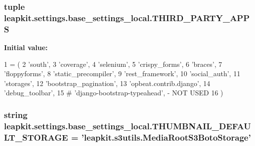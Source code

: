 \hypertarget{namespaceleapkit_1_1settings_1_1base__settings__local_a0d60a9ab4614c31fde45d98813148e97}{
\subsubsection[{T\-H\-I\-R\-D\-\_\-\-P\-A\-R\-T\-Y\-\_\-\-A\-P\-P\-S}]{\setlength{\rightskip}{0pt plus 5cm}tuple leapkit.\-settings.\-base\-\_\-settings\-\_\-local.\-T\-H\-I\-R\-D\-\_\-\-P\-A\-R\-T\-Y\-\_\-\-A\-P\-P\-S}}\label{namespaceleapkit_1_1settings_1_1base__settings__local_a0d60a9ab4614c31fde45d98813148e97}
{\bfseries Initial value\-:}
\begin{DoxyCode}
1 = (
2     \textcolor{stringliteral}{'south'},
3     \textcolor{stringliteral}{'coverage'},
4     \textcolor{stringliteral}{'selenium'},
5     \textcolor{stringliteral}{'crispy\_forms'},
6     \textcolor{stringliteral}{'braces'},
7     \textcolor{stringliteral}{'floppyforms'},
8     \textcolor{stringliteral}{'static\_precompiler'},
9     \textcolor{stringliteral}{'rest\_framework'},
10     \textcolor{stringliteral}{'social\_auth'},
11     \textcolor{stringliteral}{'storages'},
12     \textcolor{stringliteral}{'bootstrap\_pagination'},
13     \textcolor{stringliteral}{'opbeat.contrib.django'},
14     \textcolor{stringliteral}{'debug\_toolbar'},
15     \textcolor{comment}{# 'django-bootstrap-typeahead', - NOT USED}
16 )
\end{DoxyCode}
\hypertarget{namespaceleapkit_1_1settings_1_1base__settings__local_aba0bef6113f81b14dcf60a3aa9d68126}{
\subsubsection[{T\-H\-U\-M\-B\-N\-A\-I\-L\-\_\-\-D\-E\-F\-A\-U\-L\-T\-\_\-\-S\-T\-O\-R\-A\-G\-E}]{\setlength{\rightskip}{0pt plus 5cm}string leapkit.\-settings.\-base\-\_\-settings\-\_\-local.\-T\-H\-U\-M\-B\-N\-A\-I\-L\-\_\-\-D\-E\-F\-A\-U\-L\-T\-\_\-\-S\-T\-O\-R\-A\-G\-E = 'leapkit.\-s3utils.\-Media\-Root\-S3\-Boto\-Storage'}}\label{namespaceleapkit_1_1settings_1_1base__settings__local_aba0bef6113f81b14dcf60a3aa9d68126}
